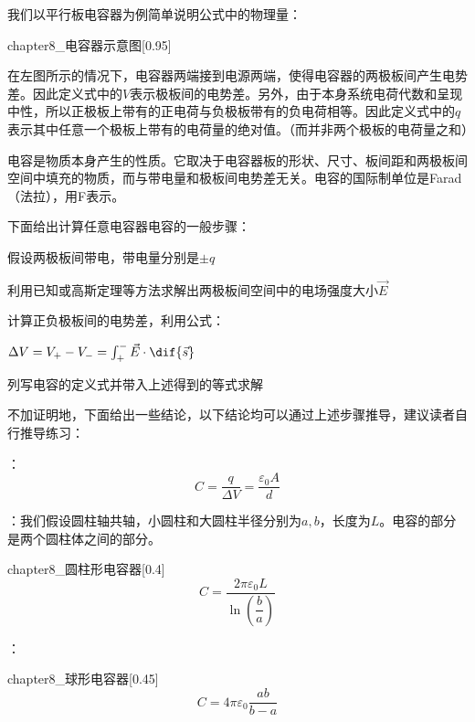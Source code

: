 我们以平行板电容器为例简单说明公式中的物理量：
\vspace{2mm}

\begin{minipage}{0.45\textwidth}
    \begin{singlefigure}[电容器示意图]{chapter8_电容器示意图}[0.95]
    \end{singlefigure}
\end{minipage}
\begin{minipage}{0.5\textwidth}
    在左图所示的情况下，电容器两端接到电源两端，使得电容器的两极板间产生电势差。因此定义式中的$V$表示极板间的电势差。另外，由于本身系统电荷代数和呈现中性，所以正极板上带有的正电荷与负极板带有的负电荷相等。因此定义式中的$q$表示其中任意一个极板上带有的电荷量的绝对值。（而并非两个极板的电荷量之和）
\end{minipage}
\vspace{2mm}

电容是物质本身产生的性质。它取决于电容器板的形状、尺寸、板间距和两极板间空间中填充的物质，而与带电量和极板间电势差无关。电容的国际制单位是Farad（法拉），用F表示。

下面给出计算任意电容器电容的一般步骤：
\begin{Itemize}
    \item 假设两极板间带电，带电量分别是$\pm q$
    \item 利用已知或高斯定理等方法求解出两极板间空间中的电场强度大小$\vec{E}$
    \item 计算正负极板间的电势差，利用公式：
    \begin{center}
        $\Delta V=V_{+}-V_{-}=\int_{+}^{-} \vec{E}\cdot \dif{\vec{s}}$
    \end{center}
    \item 列写电容的定义式并带入上述得到的等式求解
\end{Itemize}

不加证明地，下面给出一些结论，以下结论均可以通过上述步骤推导，建议读者自行推导练习：
\begin{Itemize}
    \item {}：
        \[C=\dfrac{q}{\Delta V}=\dfrac{\varepsilon_0 A}{d}\]
    \item {}：我们假设圆柱轴共轴，小圆柱和大圆柱半径分别为$a,b$，长度为$L$。电容的部分是两个圆柱体之间的部分。
    \begin{singlefigure}[圆柱形电容器]{chapter8_圆柱形电容器}[0.4]
        \[C=\dfrac{2\pi\varepsilon_0 L}{\ln(\dfrac{b}{a})}\]
    \end{singlefigure}
    \item {}：
    \begin{singlefigure}[球形电容器]{chapter8_球形电容器}[0.45]
        \[C=4\pi\varepsilon_0\dfrac{ab}{b-a}\]
    \end{singlefigure}
\end{Itemize}

